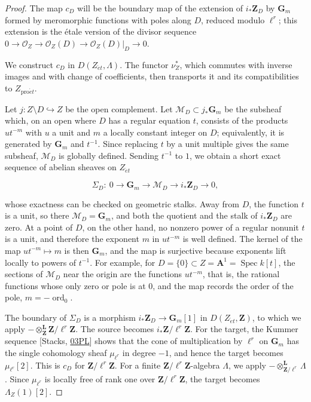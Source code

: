 \documentclass[11pt]{article}
\begin{document}
\begin{proof}[{Proof}]\label{bp12}%
The map \(c_D\) will be the boundary map of the extension of \(i_*\mathbf Z_D\) by \(\mathbf G_m\) formed by meromorphic functions with poles along \(D\), reduced modulo \(\ell^r\); this extension is the étale version of the divisor sequence \(0\to\mathcal O_Z\to\mathcal O_Z(D)\to
\mathcal O_Z(D)|_D\to0\).

We construct \(c_D\) in \(D(Z_{\acute{e}t},\Lambda)\). The functor \(\nu_Z^*\), which commutes with inverse images and with change of coefficients, then transports it and its compatibilities to \(Z_{\mathrm{pro}\acute{e}t}\).

Let \(j:Z\setminus D\hookrightarrow Z\) be the open complement. Let \(\mathcal M_D\subset j_*\mathbf G_m\) be the subsheaf which, on an open where \(D\) has a regular equation \(t\), consists of the products \(ut^{-m}\) with \(u\) a unit and \(m\) a locally constant integer on \(D\); equivalently, it is generated by \(\mathbf G_m\) and \(t^{-1}\). Since replacing \(t\) by a unit multiple gives the same subsheaf, \(\mathcal M_D\) is globally defined. Sending \(t^{-1}\) to \(1\), we obtain a short exact sequence of abelian sheaves on \(Z_{\acute{e}t}\)

\[
\Sigma_D:\ 0\longrightarrow\mathbf G_m\longrightarrow \mathcal M_D
\longrightarrow i_*\mathbf Z_D\longrightarrow0,
\tag{6.3}
\]

whose exactness can be checked on geometric stalks. Away from \(D\), the function \(t\) is a unit, so there \(\mathcal M_D=\mathbf G_m\), and both the quotient and the stalk of \(i_*\mathbf Z_D\) are zero. At a point of \(D\), on the other hand, no nonzero power of a regular nonunit \(t\) is a unit, and therefore the exponent \(m\) in \(ut^{-m}\) is well defined. The kernel of the map \(ut^{-m}\mapsto m\) is then \(\mathbf G_m\), and the map is surjective because exponents lift locally to powers of \(t^{-1}\). For example, for \(D=\{0\}\subset Z=\mathbf A^1=\operatorname{Spec}k[t]\), the sections of \(\mathcal M_D\) near the origin are the functions \(ut^{-m}\), that is, the rational functions whose only zero or pole is at \(0\), and the map records the order of the pole, \(m=-\operatorname{ord}_0\).

The boundary of \(\Sigma_D\) is a morphism \(i_*\mathbf Z_D\to\mathbf G_m[1]\) in \(D(Z_{\acute{e}t},\mathbf Z)\), to which we apply \(-\otimes^{\mathbf L}_{\mathbf Z}\mathbf Z/\ell^r\mathbf Z\). The source becomes \(i_*\mathbf Z/\ell^r\mathbf Z\). For the target, the Kummer sequence [Stacks, \href{https://stacks.math.columbia.edu/tag/03PL}{03PL}] shows that the cone of multiplication by \(\ell^r\) on \(\mathbf G_m\) has the single cohomology sheaf \(\mu_{\ell^r}\) in degree \(-1\), and hence the target becomes \(\mu_{\ell^r}[2]\). This is \(c_D\) for \(\mathbf Z/\ell^r\mathbf Z\). For a finite \(\mathbf Z/\ell^r\mathbf Z\)-algebra \(\Lambda\), we apply \(-\otimes^{\mathbf L}_{\mathbf Z/\ell^r}\Lambda\). Since \(\mu_{\ell^r}\) is locally free of rank one over \(\mathbf Z/\ell^r\mathbf Z\), the target becomes \(\Lambda_Z(1)[2]\).


\end{proof}
\end{document}
